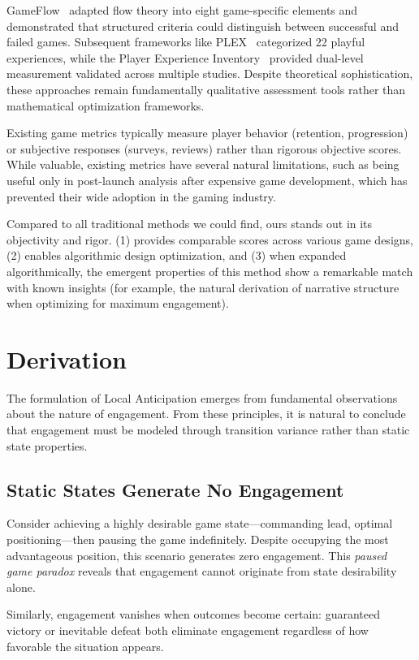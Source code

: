 \documentclass[manuscript,review,anonymous]{acmart}
\theoremstyle{definition}
\theoremstyle{plain}
\begin{document}
GameFlow~\cite{sweetser2005gameflow} adapted flow theory into eight game-specific elements and demonstrated that structured criteria could distinguish between successful and failed games.
Subsequent frameworks like PLEX~\cite{arrasvuori2011plex} categorized 22 playful experiences, while the Player Experience Inventory~\cite{abeele2020pxi} provided dual-level measurement validated across multiple studies.
Despite theoretical sophistication, these approaches remain fundamentally qualitative assessment tools rather than mathematical optimization frameworks.

Existing game metrics typically measure player behavior (retention, progression) or subjective responses (surveys, reviews) rather than rigorous objective scores.
While valuable, existing metrics have several natural limitations, such as being useful only in post-launch analysis after expensive game development, which has prevented their wide adoption in the gaming industry.

Compared to all traditional methods we could find, ours stands out in its objectivity and rigor. (1) provides comparable scores across various game designs, (2) enables algorithmic design optimization, and (3) when expanded algorithmically, the emergent properties of this method show a remarkable match with known insights (for example, the natural derivation of narrative structure when optimizing for maximum engagement).

\section{Derivation}
The formulation of Local Anticipation emerges from fundamental observations about the nature of engagement. From these principles, it is natural to conclude that engagement must be modeled through transition variance rather than static state properties.

\subsection{Static States Generate No Engagement}
Consider achieving a highly desirable game state---commanding lead, optimal positioning---then pausing the game indefinitely.
Despite occupying the most advantageous position, this scenario generates zero engagement.
This \emph{paused game paradox} reveals that engagement cannot originate from state desirability alone.

Similarly, engagement vanishes when outcomes become certain: guaranteed victory or inevitable defeat both eliminate engagement regardless of how favorable the situation appears.
\end{document}
